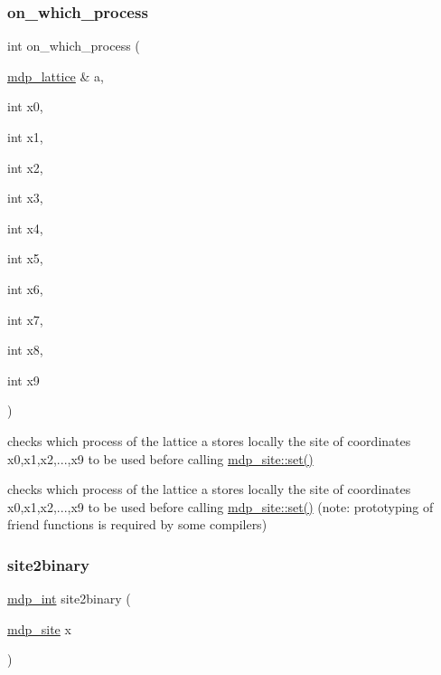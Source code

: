\subsubsection{\texorpdfstring{on\+\_\+which\+\_\+process}{on\_which\_process}}
{\footnotesize\ttfamily int on\+\_\+which\+\_\+process (\begin{DoxyParamCaption}\item[{\hyperlink{classmdp__lattice}{mdp\+\_\+lattice} \&}]{a,  }\item[{int}]{x0,  }\item[{int}]{x1,  }\item[{int}]{x2,  }\item[{int}]{x3,  }\item[{int}]{x4,  }\item[{int}]{x5,  }\item[{int}]{x6,  }\item[{int}]{x7,  }\item[{int}]{x8,  }\item[{int}]{x9 }\end{DoxyParamCaption})\hspace{0.3cm}{\ttfamily [friend]}}

checks which process of the lattice a stores locally the site of coordinates x0,x1,x2,...,x9 to be used before calling \hyperlink{classmdp__site_a241eb259576cbe7354d1ff714d22416c}{mdp\+\_\+site\+::set()}

checks which process of the lattice a stores locally the site of coordinates x0,x1,x2,...,x9 to be used before calling \hyperlink{classmdp__site_a241eb259576cbe7354d1ff714d22416c}{mdp\+\_\+site\+::set()} (note\+: prototyping of friend functions is required by some compilers) \mbox{\label{classmdp__site_a03c9871dd1382a293be5394fafda9718}} 
\subsubsection{\texorpdfstring{site2binary}{site2binary}}
{\footnotesize\ttfamily \hyperlink{mdp__global__vars_8h_aaa1ad9d0dcd2124aa5af0120d9954174}{mdp\+\_\+int} site2binary (\begin{DoxyParamCaption}\item[{\hyperlink{classmdp__site}{mdp\+\_\+site}}]{x }\end{DoxyParamCaption})\hspace{0.3cm}{\ttfamily [friend]}}

